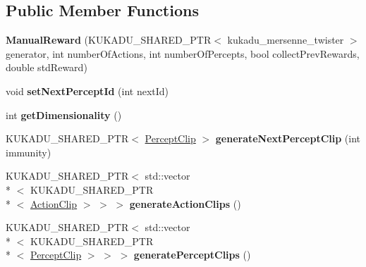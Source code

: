 \subsection*{Public Member Functions}
\begin{DoxyCompactItemize}
\item 
\hypertarget{classkukadu_1_1ManualReward_a318822b732a0011ff4ff7cc8ff3d1a05}{{\bfseries Manual\-Reward} (K\-U\-K\-A\-D\-U\-\_\-\-S\-H\-A\-R\-E\-D\-\_\-\-P\-T\-R$<$ kukadu\-\_\-mersenne\-\_\-twister $>$ generator, int number\-Of\-Actions, int number\-Of\-Percepts, bool collect\-Prev\-Rewards, double std\-Reward)}\label{classkukadu_1_1ManualReward_a318822b732a0011ff4ff7cc8ff3d1a05}

\item 
\hypertarget{classkukadu_1_1ManualReward_a5822e7d8bef85ce182c0c8c82651cc33}{void {\bfseries set\-Next\-Percept\-Id} (int next\-Id)}\label{classkukadu_1_1ManualReward_a5822e7d8bef85ce182c0c8c82651cc33}

\item 
\hypertarget{classkukadu_1_1ManualReward_a0c22cd7ef3f972b6294ace8847283403}{int {\bfseries get\-Dimensionality} ()}\label{classkukadu_1_1ManualReward_a0c22cd7ef3f972b6294ace8847283403}

\item 
\hypertarget{classkukadu_1_1ManualReward_a0fc7e055ddabdf964dc073b795a6b701}{K\-U\-K\-A\-D\-U\-\_\-\-S\-H\-A\-R\-E\-D\-\_\-\-P\-T\-R$<$ \hyperlink{classkukadu_1_1PerceptClip}{Percept\-Clip} $>$ {\bfseries generate\-Next\-Percept\-Clip} (int immunity)}\label{classkukadu_1_1ManualReward_a0fc7e055ddabdf964dc073b795a6b701}

\item 
\hypertarget{classkukadu_1_1ManualReward_ab265fb63722a405fa1b5cfaa9d96b47f}{K\-U\-K\-A\-D\-U\-\_\-\-S\-H\-A\-R\-E\-D\-\_\-\-P\-T\-R$<$ std\-::vector\\*
$<$ K\-U\-K\-A\-D\-U\-\_\-\-S\-H\-A\-R\-E\-D\-\_\-\-P\-T\-R\\*
$<$ \hyperlink{classkukadu_1_1ActionClip}{Action\-Clip} $>$ $>$ $>$ {\bfseries generate\-Action\-Clips} ()}\label{classkukadu_1_1ManualReward_ab265fb63722a405fa1b5cfaa9d96b47f}

\item 
\hypertarget{classkukadu_1_1ManualReward_a6bc98a96fc54aaad311d35c7b1043d65}{K\-U\-K\-A\-D\-U\-\_\-\-S\-H\-A\-R\-E\-D\-\_\-\-P\-T\-R$<$ std\-::vector\\*
$<$ K\-U\-K\-A\-D\-U\-\_\-\-S\-H\-A\-R\-E\-D\-\_\-\-P\-T\-R\\*
$<$ \hyperlink{classkukadu_1_1PerceptClip}{Percept\-Clip} $>$ $>$ $>$ {\bfseries generate\-Percept\-Clips} ()}\label{classkukadu_1_1ManualReward_a6bc98a96fc54aaad311d35c7b1043d65}

\end{DoxyCompactItemize}
